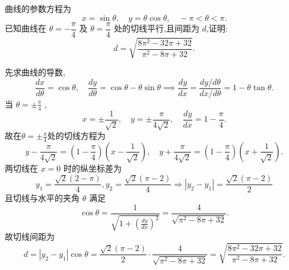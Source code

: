 \begin{questions}

    \question 曲线的参数方程为
    \[
    x = \sin\theta, \quad y = \theta \cos\theta, \quad -\pi < \theta < \pi.
    \]
    已知曲线在 $\theta = -\dfrac{\pi}{4}$ 及 $\theta = \dfrac{\pi}{4}$ 处的切线平行,且间距为 $d$,证明:
    \[
    d = \sqrt{\frac{8\pi^2 - 32\pi + 32}{\pi^2 - 8\pi + 32}}.
    \]
    \begin{solution}
        先求曲线的导数,
        \[
        \frac{dx}{d\theta} = \cos\theta, \quad \frac{dy}{d\theta} = \cos\theta - \theta\sin\theta \implies \frac{dy}{dx} = \frac{dy/d\theta}{dx/d\theta} = 1 - \theta\tan\theta.
        \]
        当 $\theta=\pm \frac{\pi}{4}$ ,
        \[
        x = \pm \frac{1}{\sqrt{2}}, \quad y = \pm \frac{\pi}{4\sqrt{2}}, \quad \frac{dy}{dx} = 1 - \frac{\pi}{4}.
        \]
        故在$\theta=\pm \frac{\pi}{4}$处的切线方程为
        \[
        y - \frac{\pi}{4\sqrt{2}} = \left(1 - \frac{\pi}{4}\right)\left(x - \frac{1}{\sqrt{2}}\right), \quad y + \frac{\pi}{4\sqrt{2}} = \left(1 - \frac{\pi}{4}\right)\left(x + \frac{1}{\sqrt{2}}\right).
        \]
        两切线在 $x=0$ 时的纵坐标差为
        \[
        y_1 = \frac{\sqrt{2}(2-\pi)}{4}, y_2 = \frac{\sqrt{2}(\pi-2)}{4} \Rightarrow |y_2 - y_1| = \frac{\sqrt{2}(\pi-2)}{2}
        \]
        且切线与水平的夹角 $\theta$ 满足
        \[
        \cos\theta = \frac{1}{\sqrt{1+(\frac{dy}{dx})^2}} = \frac{4}{\sqrt{\pi^2 - 8\pi + 32}}.
        \]
        故切线间距为
        \[
        d = |y_2 - y_1| \cos\theta = \frac{\sqrt{2}(\pi-2)}{2} \cdot \frac{4}{\sqrt{\pi^2 - 8\pi + 32}} = \sqrt{\frac{8\pi^2 - 32\pi + 32}{\pi^2 - 8\pi + 32}}.
        \]
    \end{solution}


\end{questions}
